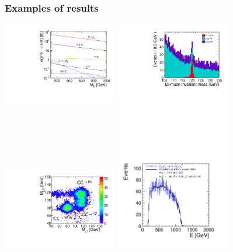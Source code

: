 \documentclass{beamer}
\begin{document}
\begin{frame}
\frametitle{Examples of results}
\begin{center}
\includegraphics[width=5cm]{./xsec_vs_Hmass_sqrts3000.pdf}
\includegraphics[width=5cm]{./ee_h_mumu_mass_mh120GeV.pdf}\\
\includegraphics[width=5cm]{./MassPlot2D.pdf}
\includegraphics[width=5cm]{./205_H1LPADC4.pdf}
\end{center}
\end{frame}
\end{document}
